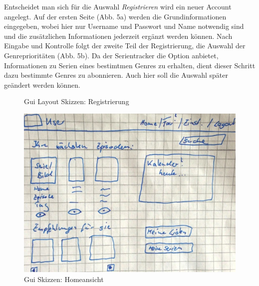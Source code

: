 \documentclass[a4paper]{article}
\begin{document}
\newpage

Entscheidet man sich für die Auswahl \textit{Registrieren} wird ein neuer Account angelegt. Auf der ersten Seite (Abb. 5a) werden die Grundinformationen eingegeben, wobei hier nur Username und Passwort und Name notwendig sind und die zusätzlichen Informationen jederzeit ergänzt werden können. Nach Eingabe und Kontrolle folgt der zweite Teil der Registrierung, die Auswahl der Genreprioritäten (Abb. 5b). Da der Serientracker die Option anbietet, Informationen zu Serien eines bestimtmen Genres zu erhalten, dient dieser Schritt dazu bestimmte Genres zu abonnieren. Auch hier soll die Auswahl später geändert werden können.\\

\begin{figure}[h!]
\centering
\hfill 
{}
\hfill %
\hfill %
\caption{Gui Layout Skizzen: Registrierung }
\label{Gui}
\end{figure}

\parskip 12pt
\parindent 0pt


\begin{figure}
\centering
\includegraphics[width=.5\textwidth]{images/dokulayout/home.jpg}
\caption{Gui Skizzen: Homeansicht}
\end{figure}
\end{document}
